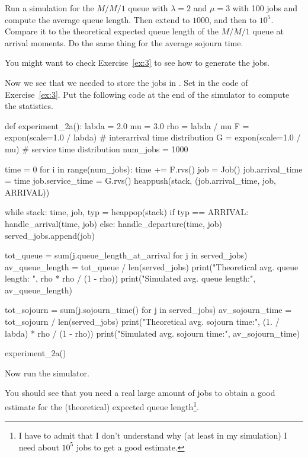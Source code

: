 \begin{exercise}
  Run a simulation for the $M/M/1$ queue with $\lambda=2$ and $\mu=3$ with 100 jobs and compute the average queue length. Then extend to $1000$, and then to $10^5$. Compare it to the theoretical expected queue length of the $M/M/1$ queue at arrival moments. Do the same thing for the average sojourn time.

\begin{hint}
You might want to check Exercise~\ref{ex:3} to see how to generate the jobs.
\end{hint}
\begin{solution}
    Now we see that we needed to store the jobs in . Set
in the code of Exercise~\ref{ex:3}. Put the following code at the end of the simulator to compute the statistics.
    \begin{pyverbatim}
def experiment_2a():
    labda = 2.0
    mu = 3.0
    rho = labda / mu
    F = expon(scale=1.0 / labda)  # interarrival time distribution
    G = expon(scale=1.0 / mu)  # service time distribution
    num_jobs = 1000

    time = 0
    for i in range(num_jobs):
        time += F.rvs()
        job = Job()
        job.arrival_time = time
        job.service_time = G.rvs()
        heappush(stack, (job.arrival_time, job, ARRIVAL))

    while stack:
        time, job, typ = heappop(stack)
        if typ == ARRIVAL:
            handle_arrival(time, job)
        else:
            handle_departure(time, job)
            served_jobs.append(job)

    tot_queue = sum(j.queue_length_at_arrival for j in served_jobs)
    av_queue_length = tot_queue / len(served_jobs)
    print("Theoretical avg. queue length: ", rho * rho / (1 - rho))
    print("Simulated avg. queue length:", av_queue_length)

    tot_sojourn = sum(j.sojourn_time() for j in served_jobs)
    av_sojourn_time = tot_sojourn / len(served_jobs)
    print("Theoretical avg. sojourn time:", (1. / labda) * rho / (1 - rho))
    print("Simulated avg. sojourn time:", av_sojourn_time)


experiment_2a()
  \end{pyverbatim}

Now run the simulator.

You should see that you need a real large amount of jobs to obtain a good estimate for the (theoretical) expected queue length\footnote{I have to admit that I don't understand why (at least in my simulation) I need about $10^5$ jobs to get a good estimate.}.

  \end{solution}
\end{exercise}

